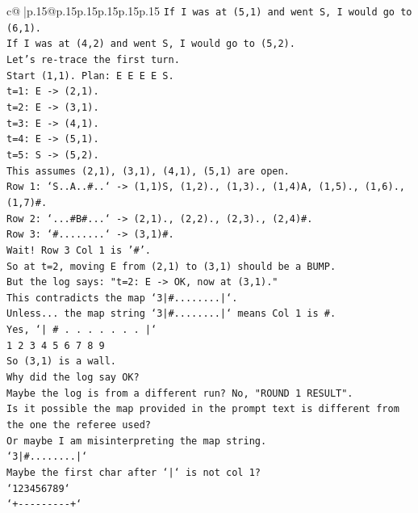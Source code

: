\documentclass{article}
\begin{document}
{\begin{supertabular}{c@{$\;$}|p{.15\linewidth}@{}p{.15\linewidth}p{.15\linewidth}p{.15\linewidth}p{.15\linewidth}p{.15\linewidth}}
{{{\texttt{If I was at (5,1) and went S, I would go to (6,1).} \\
\texttt{If I was at (4,2) and went S, I would go to (5,2).} \\
\texttt{Let's re{-}trace the first turn.} \\
\texttt{Start (1,1). Plan: E E E E S.} \\
\texttt{t=1: E {-}> (2,1).} \\
\texttt{t=2: E {-}> (3,1).} \\
\texttt{t=3: E {-}> (4,1).} \\
\texttt{t=4: E {-}> (5,1).} \\
\texttt{t=5: S {-}> (5,2).} \\
\texttt{This assumes (2,1), (3,1), (4,1), (5,1) are open.} \\
\texttt{Row 1: `S..A..\#..` {-}> (1,1)S, (1,2)., (1,3)., (1,4)A, (1,5)., (1,6)., (1,7)\#.} \\
\texttt{Row 2: `...\#B\#...` {-}> (2,1)., (2,2)., (2,3)., (2,4)\#.} \\
\texttt{Row 3: `\#........` {-}> (3,1)\#.} \\
\texttt{Wait! Row 3 Col 1 is '\#'.} \\
\texttt{So at t=2, moving E from (2,1) to (3,1) should be a BUMP.} \\
\texttt{But the log says: "t=2: E {-}> OK, now at (3,1)."} \\
\texttt{This contradicts the map `3|\#........|`.} \\
\texttt{Unless... the map string `3|\#........|` means Col 1 is \#.} \\
\texttt{Yes, `| \# . . . . . . . |`} \\
\texttt{1 2 3 4 5 6 7 8 9} \\
\texttt{So (3,1) is a wall.} \\
\texttt{Why did the log say OK?} \\
\texttt{Maybe the log is from a different run? No, "ROUND 1 RESULT".} \\
\texttt{Is it possible the map provided in the prompt text is different from the one the referee used?} \\
\texttt{Or maybe I am misinterpreting the map string.} \\
\texttt{`3|\#........|`} \\
\texttt{Maybe the first char after `|` is not col 1?} \\
\texttt{`123456789`} \\
\texttt{`+{-}{-}{-}{-}{-}{-}{-}{-}{-}+`} \\
}}}
\end{supertabular}}
\end{document}
